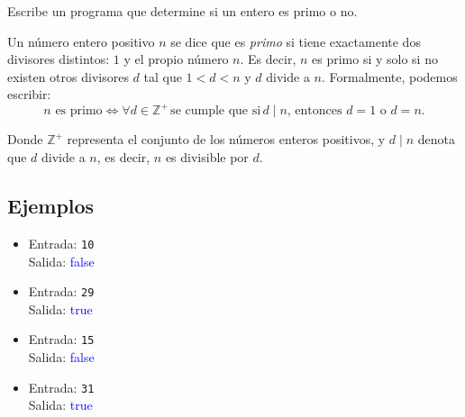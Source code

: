 Escribe un programa que determine si un entero es primo o no.
    
Un número entero positivo \( n \) se dice que es \textit{primo} si tiene exactamente dos divisores distintos: \( 1 \) y el propio número \( n \). Es decir, \( n \) es primo si y solo si no existen otros divisores \( d \) tal que \( 1 < d < n \) y \( d \) divide a \( n \). Formalmente, podemos escribir:
\[
n \text{ es primo} \iff \forall d \in \mathbb{Z}^+ \, \text{se cumple que si} \, d \mid n \text{, entonces } d = 1 \text{ o } d = n.
\]

Donde \( \mathbb{Z}^+ \) representa el conjunto de los números enteros positivos, y \( d \mid n \) denota que \( d \) divide a \( n \), es decir, \( n \) es divisible por \( d \).
\subsection*{Ejemplos}
\begin{itemize}
    \item Entrada: \texttt{10}\\
          Salida: \textcolor{blue}{false}
    \item Entrada: \texttt{29}\\
          Salida: \textcolor{blue}{true}
    \item Entrada: \texttt{15}\\
          Salida: \textcolor{blue}{false}
    \item Entrada: \texttt{31}\\
          Salida: \textcolor{blue}{true}
\end{itemize}